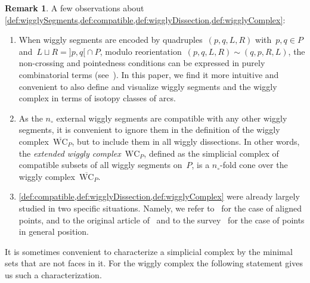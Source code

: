 \documentclass{amsart}
\newtheorem{theorem}{Theorem}%
\theoremstyle{definition}
\newtheorem{remark}[theorem]{Remark}
\newcommand{\darkblue}{\color{darkblue}} %
\newcommand{\defn}[1]{\textsl{\darkblue #1}} %
\newcommand{\extendedWigglyComplex}{\mathrm{WC}} %
\newcommand{\reducedWigglyComplex}{\overline{\mathrm{WC}}} %
\begin{document}
\begin{remark}
A few observations about \cref{def:wigglySegments,def:compatible,def:wigglyDissection,def:wigglyComplex}:
\begin{enumerate}
\item When wiggly segments are encoded by quadruples~$(p, q, L, R)$ with~$p,q \in P$ and~$L \sqcup R  = {]p,q[} \cap P$, modulo reorientation~$(p, q, L, R) \sim (q, p, R, L)$, the non-crossing and pointedness conditions can be expressed in purely combinatorial terms (see~\cite{BapatPilaud}). In this paper, we find it more intuitive and convenient to also define and visualize wiggly segments and the wiggly complex in terms of isotopy classes of arcs.
\item As the $n_\circ$ external wiggly segments are compatible with any other wiggly segments, it is convenient to ignore them in the definition of the wiggly complex~$\reducedWigglyComplex_P$, but to include them in all wiggly dissections.
In other words, the \defn{extended wiggly complex}~$\extendedWigglyComplex_P$, defined as the simplicial complex of compatible subsets of all wiggly segments on~$P$, is a $n_\circ$-fold cone over the wiggly complex~$\reducedWigglyComplex_P$.
\item \cref{def:compatible,def:wigglyDissection,def:wigglyComplex} were already largely studied in two specific situations. Namely, we refer to~\cite{BapatPilaud-wigglyaligned} for the case of aligned points, and to the original article of~\cite{PocchiolaVegter} and to the survey~\cite{RoteSantosStreinu-pseudotriangulations} for the case of points in general position.
\end{enumerate}
\end{remark}

%

It is sometimes convenient to characterize a simplicial complex by the minimal sets that are not faces in it. For the wiggly complex the following statement gives us such a characterization.
\end{document}

